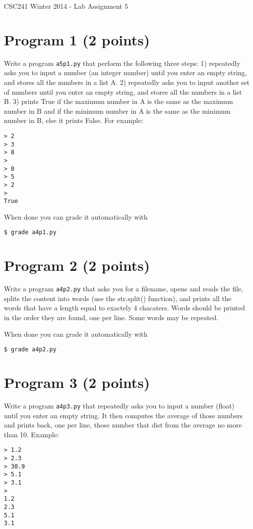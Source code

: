 \documentclass[12pt]{article}
\begin{document}
{\Large CSC241 Winter 2014 - Lab Assignment 5}

\section{Program 1 (2 points)}

\noindent
Write a program {\tt a5p1.py} that perform the following three steps: 1) repeatedly asks you to input a number (an integer number) until you enter an empty string, and stores all the numbers in a list A. 2) repeatedly asks you to input another set of numbers until you enter an empty string, and stores all the numbers in a list B. 3) prints True if the maximum number in A is the same as the maximum number in B and if the minimum number in A is the same as the minimum number in B, else it prints False. For example:
\begin{verbatim}
> 2
> 3
> 8
> 
> 8
> 5
> 2
>
True
\end{verbatim}
\noindent When done you can grade it automatically with
\begin{verbatim}
$ grade a4p1.py
\end{verbatim}


\section{Program 2 (2 points)}

\noindent
Write a program {\tt a4p2.py} that asks you for a filename, opens and reads the file, splits the content into words (use the str.split() function), and prints all the words that have a length equal to exactely 4 chacaters. Words should be printed in the order they are found, one per line. Some words may be repeated.

\noindent When done you can grade it automatically with
\begin{verbatim}
$ grade a4p2.py
\end{verbatim}


\section{Program 3 (2 points)}

\noindent
Write a program {\tt a4p3.py} that repeatedly asks you to input a number (float) until 
you enter an empty string. It then computes the average of those numbers and prints back, one per line, those number that dist from the average no more than 10. Example:

\begin{verbatim}
> 1.2
> 2.3
> 30.9
> 5.1
> 3.1
>
1.2
2.3
5.1
3.1
\end{verbatim}
\end{document}
